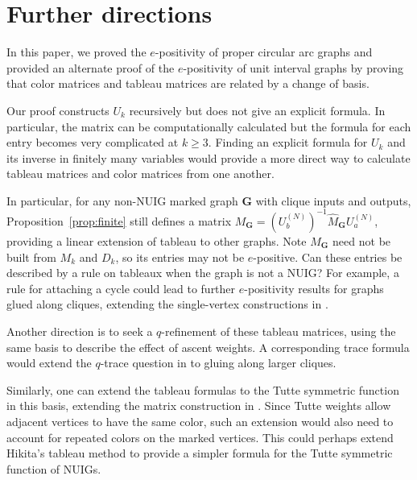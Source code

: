 \documentclass[12pt]{article}
\theoremstyle{plain}
\theoremstyle{definition}
\theoremstyle{remark}
\newcommand{\bG}{\mathbf{G}}
\begin{document}
\section{Further directions}\label{section:conclusions}

In this paper, we proved the $e$-positivity of proper circular arc graphs and provided an alternate proof of the $e$-positivity of unit interval graphs by proving that color matrices and tableau matrices are related by a change of basis.

Our proof constructs $U_k$ recursively but does not give an explicit formula. In particular, the matrix can be computationally calculated but the formula for each entry becomes very complicated at $k\geq 3$. Finding an explicit formula for $U_k$ and its inverse in finitely many variables would provide a more direct way to calculate tableau matrices and color matrices from one another.

In particular, for any non-NUIG marked graph $\bG$ with clique inputs and outputs, Proposition~\ref{prop:finite} still defines a matrix $M_{\bG}=(U_b^{(N)})^{-1}\hat M_\bG U_a^{(N)}$, providing a linear extension of tableau to other graphs. Note $M_{\bG}$ need not be built from $M_k$ and $D_k$, so its entries may not be $e$-positive. Can these entries be described by a rule on tableaux when the graph is not a NUIG? For example, a rule for attaching a cycle could lead to further $e$-positivity results for graphs glued along cliques, extending the
single-vertex constructions in \cite{singlegluing}.

 
Another direction is to seek a $q$-refinement of these tableau matrices, using the same basis to describe the effect of ascent weights. A corresponding trace formula would extend the $q$-trace question in \cite[Conjecture 74]{singlegluing} to gluing along larger cliques.


Similarly, one can extend the tableau formulas to the
Tutte symmetric function in this basis, extending the matrix
construction in \cite{tuttematrix}. Since Tutte weights allow adjacent
vertices to have the same color, such an extension would also need to
account for repeated colors on the marked vertices. This could perhaps extend Hikita's tableau method to provide a simpler formula for the Tutte symmetric function of NUIGs.
\end{document}
